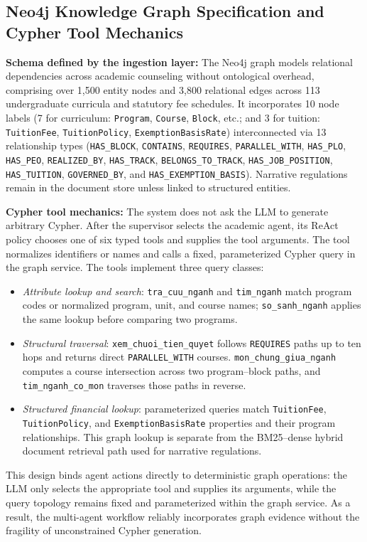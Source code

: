 \subsection{Neo4j Knowledge Graph Specification and Cypher Tool Mechanics}
\label{sec:neo4j_graph}

\textbf{Schema defined by the ingestion layer:}
The Neo4j graph models relational dependencies across academic counseling without ontological overhead, comprising over 1,500 entity nodes and 3,800 relational edges across 113 undergraduate curricula and statutory fee schedules. It incorporates 10 node labels (7 for curriculum: \texttt{Program}, \texttt{Course}, \texttt{Block}, etc.; and 3 for tuition: \texttt{TuitionFee}, \texttt{TuitionPolicy}, \texttt{ExemptionBasisRate}) interconnected via 13 relationship types (\texttt{HAS\_BLOCK}, \texttt{CONTAINS}, \texttt{REQUIRES}, \texttt{PARALLEL\_WITH}, \texttt{HAS\_PLO}, \texttt{HAS\_PEO}, \texttt{REALIZED\_BY}, \texttt{HAS\_TRACK}, \texttt{BELONGS\_TO\_TRACK}, \texttt{HAS\_JOB\_POSITION}, \texttt{HAS\_TUITION}, \texttt{GOVERNED\_BY}, and \texttt{HAS\_EXEMPTION\_BASIS}). Narrative regulations remain in the document store unless linked to structured entities.

\textbf{Cypher tool mechanics:}
The system does not ask the LLM to generate arbitrary Cypher. After the supervisor selects the academic agent, its ReAct policy chooses one of six typed tools and supplies the tool arguments. The tool normalizes identifiers or names and calls a fixed, parameterized Cypher query in the graph service. The tools implement three query classes:
\begin{itemize}
    \setlength{\itemsep}{1.5pt}
    \setlength{\parsep}{0pt}
    \setlength{\parskip}{0pt}
    \item \emph{Attribute lookup and search}: \texttt{tra\_cuu\_nganh} and \texttt{tim\_nganh} match program codes or normalized program, unit, and course names; \texttt{so\_sanh\_nganh} applies the same lookup before comparing two programs.
    \item \emph{Structural traversal}: \texttt{xem\_chuoi\_tien\_quyet} follows \texttt{REQUIRES} paths up to ten hops and returns direct \texttt{PARALLEL\_WITH} courses. \texttt{mon\_chung\_giua\_nganh} computes a course intersection across two program--block paths, and \texttt{tim\_nganh\_co\_mon} traverses those paths in reverse.
    \item \emph{Structured financial lookup}: parameterized queries match \texttt{TuitionFee}, \texttt{TuitionPolicy}, and \texttt{ExemptionBasisRate} properties and their program relationships. This graph lookup is separate from the BM25--dense hybrid document retrieval path used for narrative regulations.
\end{itemize}
This design binds agent actions directly to deterministic graph operations: the LLM only selects the appropriate tool and supplies its arguments, while the query topology remains fixed and parameterized within the graph service. As a result, the multi-agent workflow reliably incorporates graph evidence without the fragility of unconstrained Cypher generation.

